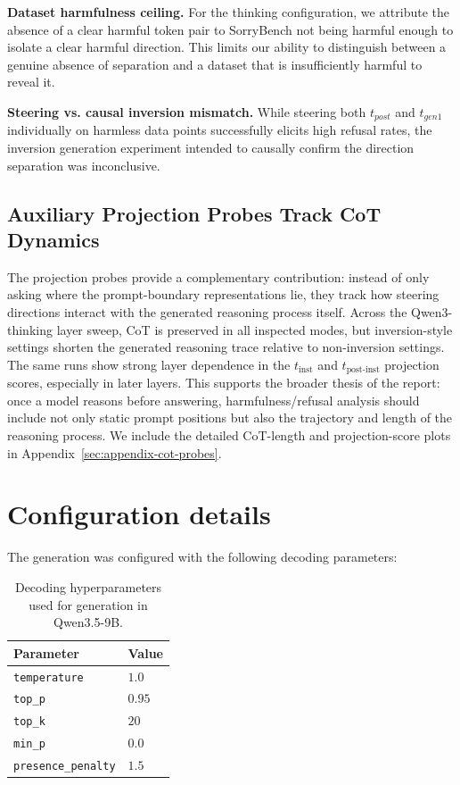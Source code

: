 \documentclass[nohyperref]{article}
\theoremstyle{plain}
\theoremstyle{definition}
\theoremstyle{remark}
\begin{document}
\textbf{Dataset harmfulness ceiling.} For the thinking configuration, we attribute the absence of a clear harmful token pair to SorryBench not being harmful enough to isolate a clear harmful direction. This limits our ability to distinguish between a genuine absence of separation and a dataset that is insufficiently harmful to reveal it.

\textbf{Steering vs. causal inversion mismatch.} While steering both $t_{post}$ and $t_{gen1}$ individually on harmless data points successfully elicits high refusal rates, the inversion generation experiment intended to causally confirm the direction separation was inconclusive. 


\clearpage



\clearpage
\appendix

\subsection{Auxiliary Projection Probes Track CoT Dynamics}

The projection probes provide a complementary contribution: instead of only asking where the prompt-boundary representations lie, they track how steering directions interact with the generated reasoning process itself. Across the Qwen3-thinking layer sweep, CoT is preserved in all inspected modes, but inversion-style settings shorten the generated reasoning trace relative to non-inversion settings. The same runs show strong layer dependence in the $t_{\text{inst}}$ and $t_{\text{post-inst}}$ projection scores, especially in later layers. This supports the broader thesis of the report: once a model reasons before answering, harmfulness/refusal analysis should include not only static prompt positions but also the trajectory and length of the reasoning process. We include the detailed CoT-length and projection-score plots in Appendix~\ref{sec:appendix-cot-probes}.
\section{Configuration details}
\label{ap:confg}

The generation was configured with the following decoding parameters:

\begin{table}[h]
\centering
\begin{tabular}{ll}
\toprule
\textbf{Parameter} & \textbf{Value} \\
\midrule
\texttt{temperature} & $1.0$ \\
\texttt{top\_p} & $0.95$ \\
\texttt{top\_k} & $20$ \\
\texttt{min\_p} & $0.0$ \\
\texttt{presence\_penalty} & $1.5$ \\
\bottomrule
\end{tabular}
\caption{Decoding hyperparameters used for generation in Qwen3.5-9B.}
\label{tab:config}
\end{table}
\end{document}

